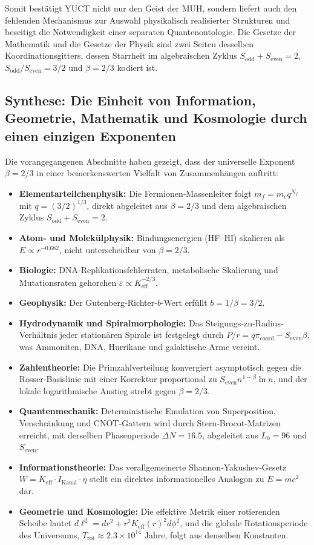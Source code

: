 \documentclass[12pt]{article}
\newcommand{\Sodd}{S_{\mathrm{odd}}}
\newcommand{\Seven}{S_{\mathrm{even}}}
\begin{document}
	Somit bestätigt YUCT nicht nur den Geist der MUH, sondern liefert auch den fehlenden Mechanismus zur Auswahl physikalisch realisierter Strukturen und beseitigt die Notwendigkeit einer separaten Quantenontologie. Die Gesetze der Mathematik und die Gesetze der Physik sind zwei Seiten desselben Koordinationsgitters, dessen Starrheit im algebraischen Zyklus \(\Sodd + \Seven = 2\), \(\Sodd/\Seven = 3/2\) und \(\beta = 2/3\) kodiert ist.
	
	\subsection{Synthese: Die Einheit von Information, Geometrie, Mathematik und Kosmologie durch einen einzigen Exponenten}
	
	Die vorangegangenen Abschnitte haben gezeigt, dass der universelle Exponent \(\beta = 2/3\) in einer bemerkenswerten Vielfalt von Zusammenhängen auftritt:
	
	\begin{itemize}
		\item \textbf{Elementarteilchenphysik:} Die Fermionen‑Massenleiter folgt \(m_f = m_e q^{N_f}\) mit \(q = (3/2)^{1/3}\), direkt abgeleitet aus \(\beta = 2/3\) und dem algebraischen Zyklus \(S_{\mathrm{odd}}+S_{\mathrm{even}}=2\).
		\item \textbf{Atom‑ und Molekülphysik:} Bindungsenergien (HF–HI) skalieren als \(E \propto r^{-0.682}\), nicht unterscheidbar von \(\beta = 2/3\).
		\item \textbf{Biologie:} DNA‑Replikationsfehlerraten, metabolische Skalierung und Mutationsraten gehorchen \(\varepsilon \propto K_{\mathrm{eff}}^{-2/3}\).
		\item \textbf{Geophysik:} Der Gutenberg‑Richter‑\(b\)-Wert erfüllt \(b = 1/\beta = 3/2\).
		\item \textbf{Hydrodynamik und Spiralmorphologie:} Das Steigungs‐zu‐Radius‐Verhältnis jeder stationären Spirale ist festgelegt durch \(P/r = q \pi_{\mathrm{coord}} - S_{\mathrm{even}}\beta\), was Ammoniten, DNA, Hurrikane und galaktische Arme vereint.
		\item \textbf{Zahlentheorie:} Die Primzahlverteilung konvergiert asymptotisch gegen die Rosser‑Basislinie mit einer Korrektur proportional zu \(\Seven n^{1-\beta}\ln n\), und der lokale logarithmische Anstieg strebt gegen \(\beta = 2/3\).
		\item \textbf{Quantenmechanik:} Deterministische Emulation von Superposition, Verschränkung und CNOT‑Gattern wird durch Stern‑Brocot‑Matrizen erreicht, mit derselben Phasenperiode \(\Delta N = 16.5\), abgeleitet aus \(L_0=96\) und \(\Seven\).
		\item \textbf{Informationstheorie:} Das verallgemeinerte Shannon‑Yakushev‑Gesetz \(W = K_{\mathrm{eff}} \cdot I_{\mathrm{Kanal}} \cdot \eta\) stellt ein direktes informationelles Analogon zu \(E = mc^2\) dar.
		\item \textbf{Geometrie und Kosmologie:} Die effektive Metrik einer rotierenden Scheibe lautet \(d\ell^2 = dr^2 + r^2 K_{\mathrm{eff}}(r)^2 d\phi^2\), und die globale Rotationsperiode des Universums, \(T_{\mathrm{rot}} \approx 2.3\times10^{14}\) Jahre, folgt aus denselben Konstanten.
	\end{itemize}
	
\end{document}
